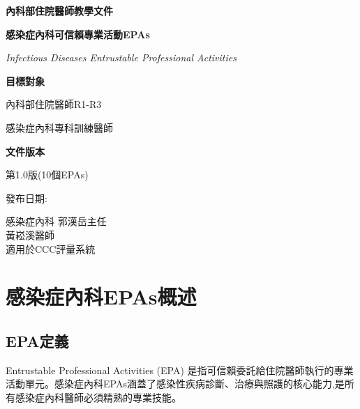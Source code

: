 \documentclass[12pt,a4paper]{article}
\newcommand{\mydate}{\DTMtoday}
\begin{document}
\begin{titlepage}
    \centering
    {\LARGE\textcolor{id_red}{\textbf{內科部住院醫師教學文件}}\par}
    \vspace{1cm}
    {\huge\bfseries 感染症內科可信賴專業活動EPAs\par}
    \vspace{0.5cm}
    {\Large\textcolor{id_orange}{\textit{Infectious Diseases Entrustable Professional Activities}}\par}
    \vspace{1cm}
    
    \begin{tcolorbox}[
        colback=id_orange!5!white,
        colframe=id_orange,
        width=0.8\textwidth,
        arc=10pt,
        boxrule=1pt
    ]
    \centering
    {\large\textbf{目標對象}\par}
    \vspace{0.3cm}
    內科部住院醫師R1-R3\par
    感染症內科專科訓練醫師\par
    \vspace{0.5cm}
    {\large\textbf{文件版本}\par}
    \vspace{0.3cm}
    第1.0版(10個EPAs)\par
    發布日期:\mydate\par
    \end{tcolorbox}

    \vfill
    
    {\large 感染症內科 郭漢岳主任 \\
    黃崧溪醫師\\
    適用於CCC評量系統\par}
    
    \vspace{0.5cm}
\end{titlepage}

\newpage
\tableofcontents
\newpage

\section{感染症內科EPAs概述}

\subsection{EPA定義}
Entrustable Professional Activities (EPA) 是指可信賴委託給住院醫師執行的專業活動單元。感染症內科EPAs涵蓋了感染性疾病診斷、治療與照護的核心能力,是所有感染症內科醫師必須精熟的專業技能。
\end{document}
